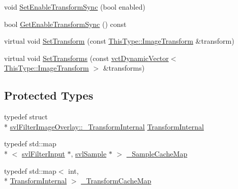 \begin{DoxyCompactItemize}
void \hyperlink{classsvl_filter_image_overlay_acfb8f04ba2e62df2d5ef285d2ca35f96}{Set\-Enable\-Transform\-Sync} (bool enabled)
\item 
bool \hyperlink{classsvl_filter_image_overlay_a1a70af2f7458fed3895f30249ff56480}{Get\-Enable\-Transform\-Sync} () const 
\item 
virtual void \hyperlink{classsvl_filter_image_overlay_afefde4a1ee3a1f8c5fecf29efa67c14f}{Set\-Transform} (const \hyperlink{classsvl_filter_image_overlay_a68354a171b2498de3aa1c5ba0ff2f002}{This\-Type\-::\-Image\-Transform} \&transform)
\item 
virtual void \hyperlink{classsvl_filter_image_overlay_a031a9989f7ea4d9ac45fa7664163baaf}{Set\-Transforms} (const \hyperlink{classvct_dynamic_vector}{vct\-Dynamic\-Vector}$<$ \hyperlink{classsvl_filter_image_overlay_a68354a171b2498de3aa1c5ba0ff2f002}{This\-Type\-::\-Image\-Transform} $>$ \&transforms)
\end{DoxyCompactItemize}
\subsection*{Protected Types}
\begin{DoxyCompactItemize}
\item 
typedef struct \\*
\hyperlink{structsvl_filter_image_overlay_1_1___transform_internal}{svl\-Filter\-Image\-Overlay\-::\-\_\-\-Transform\-Internal} \hyperlink{classsvl_filter_image_overlay_a18061cddeca5ead367351cc833ce7c4e}{Transform\-Internal}
\item 
typedef std\-::map\\*
$<$ \hyperlink{classsvl_filter_input}{svl\-Filter\-Input} $\ast$, \hyperlink{classsvl_sample}{svl\-Sample} $\ast$ $>$ \hyperlink{classsvl_filter_image_overlay_a0cb98a1b14141d0a0940656ebec8d3ea}{\-\_\-\-Sample\-Cache\-Map}
\item 
typedef std\-::map$<$ int, \\*
\hyperlink{classsvl_filter_image_overlay_a18061cddeca5ead367351cc833ce7c4e}{Transform\-Internal} $>$ \hyperlink{classsvl_filter_image_overlay_ae7f68bdaad7a6718f5d38e99099fd1a4}{\-\_\-\-Transform\-Cache\-Map}
\end{DoxyCompactItemize}
